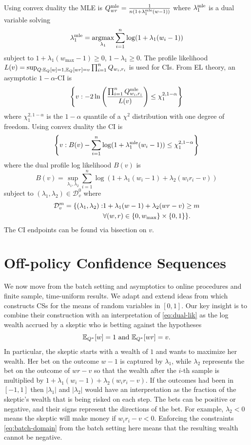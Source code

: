 Using convex duality the MLE is
$
Q^{\textrm{mle}}_{wr} = \frac{1}{n(1+\lambda_1^{\textrm{mle}}(w-1))}
$
where $\lambda_1^{\textrm{mle}}$ is a dual variable solving
\[
\lambda_1^{\textrm{mle}} = \operatorname*{argmax}_{\lambda_1} \sum_{i=1}^n \log(1+\lambda_1(w_i-1))
\]
subject to $1+\lambda_1(w_{\max}-1)\geq 0$, $1-\lambda_1\geq 0$.  The profile
likelihood
$
L(v)=\sup_{Q: \mathbb{E}_Q[w]=1, \mathbb{E}_Q[wr]=v} \prod_{i=1}^n Q_{w_i,r_i}
$
is used for CIs. From EL theory, an asymptotic $1-\alpha$-CI is
\[
\left\{v: -2\ln\left(\frac{\prod_{i=1}^n Q^{\textrm{mle}}_{w_i,r_i}}{L(v)}\right)
\leq \chi_1^{2,1-\alpha}\right\}
\]
where $\chi_1^{2,1-\alpha}$ is the $1-\alpha$ quantile of a $\chi^2$
distribution with one degree of freedom.  Using convex duality the CI is
\[
\left\{v: 
B(v)-\sum_{i=1}^n\log(1+\lambda_1^{\textrm{mle}}(w_i-1))
\leq \chi_1^{2,1-\alpha}\right\}
\]
where the dual profile log likelihood $B(v)$ is
\begin{equation}
B(v) = \sup_{\lambda_1,\lambda_2} \sum_{i=1}^n \log(1+\lambda_1(w_i-1)+\lambda_2(w_i r_i -v))    \label{eq:dual-lik}
\end{equation}
subject to $(\lambda_1,\lambda_2) \in \mathcal{D}_v^0$ where 
\begin{align}
\mathcal{D}_v^{m} =
\{(\lambda_1,\lambda_2): & 1+\lambda_1(w-1)+\lambda_2(wr-v)\geq m \label{eq:batch-domain}\notag\\
                         & \forall (w,r) \in \{0,w_{\max}\}\times \{0,1\}
\}.
\end{align}
The CI endpoints can be found via bisection on $v$.

\section{Off-policy Confidence Sequences}
We now move from the batch setting and asymptotics to online procedures and
finite sample, time-uniform results.  We adapt and extend ideas from
\citet{waudby-smith_variance-adaptive_2020} which constructs 
CSs for the means of random variables in $[0,1]$.  
Our key insight is to combine their construction with 
an interpretation of \eqref{eq:dual-lik} 
as the log wealth accrued by a
skeptic who is betting against the hypotheses 
\[
\mathbb{E}_{Q^*}[w]=1 \text{ and } \mathbb{E}_{Q^*}[wr]=v.
\]
In particular, the skeptic starts with a wealth of $1$ and wants to maximize
her wealth. Her bet on the outcome $w-1$ is captured by $\lambda_1$, while
$\lambda_2$ represents the bet on the outcome of $wr-v$ so that the wealth
after the $i$-th sample is multiplied by $1+\lambda_1(w_i-1)+\lambda_2 (w_i r_i
-v)$. If the outcomes had been in $[-1,1]$ then $|\lambda_1|$ and $|\lambda_2|$
would have an interpretation as the fraction of the skeptic's wealth that is
being risked on each step. The bets can be positive or negative, and their
signs represent the directions of the bet. For example, $\lambda_2<0$ means the
skeptic will make money if $w_ir_i-v<0$.  Enforcing the constraints
\eqref{eq:batch-domain} from the batch setting here means that the resulting
wealth cannot be negative.


